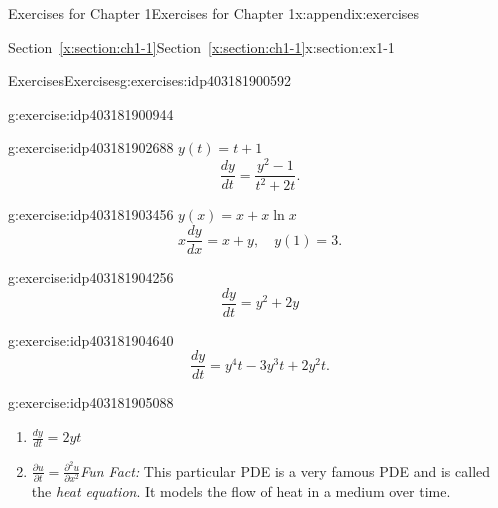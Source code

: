 \documentclass[oneside,10pt,]{book}
\newcommand{\xreffont}{\relax}
\numberwithin{equation}{section}
\numberwithin{equation}{section}
\begin{document}
\begin{appendixptx}{Exercises for Chapter 1}{}{Exercises for Chapter 1}{}{}{x:appendix:exercises}
%
%
\typeout{************************************************}
\typeout{Section B.1 Section~{\xreffont\ref*{x:section:ch1-1}}}
\typeout{************************************************}
%
\begin{sectionptx}{Section~{\xreffont\ref*{x:section:ch1-1}}}{}{Section~{\xreffont\ref*{x:section:ch1-1}}}{}{}{x:section:ex1-1}
%
%
\typeout{************************************************}
\typeout{************************************************}
%
\begin{exercises-subsection-numberless}{Exercises}{}{Exercises}{}{}{g:exercises:idp403181900592}
\begin{divisionexercise}{1}{}{}{g:exercise:idp403181900944}%
\end{divisionexercise}%
\begin{divisionexercise}{2}{}{}{g:exercise:idp403181902688}%
\(y(t)=t+1\)%
\begin{equation*}
\frac{dy}{dt}=\frac{y^{2}-1}{t^{2}+2t}.
\end{equation*}
\end{divisionexercise}%
\begin{divisionexercise}{3}{}{}{g:exercise:idp403181903456}%
\(y(x)=x+x\ln x\)%
\begin{equation*}
x\frac{dy}{dx}=x+y,\,\,\,\,\,\,y(1)=3.
\end{equation*}
\end{divisionexercise}%
\begin{divisionexercise}{4}{}{}{g:exercise:idp403181904256}%
%
\begin{equation*}
\frac{dy}{dt}=y^{2}+2y
\end{equation*}
\end{divisionexercise}%
\begin{divisionexercise}{5}{}{}{g:exercise:idp403181904640}%
%
\begin{equation*}
\frac{dy}{dt}=y^{4}t-3y^{3}t+2y^{2}t.
\end{equation*}
\end{divisionexercise}%
\begin{divisionexercise}{6}{}{}{g:exercise:idp403181905088}%
%
\begin{enumerate}[label=(\alph*)]
\item{}\(\displaystyle \frac{dy}{dt}=2yt\)%
\item{}\(\frac{\partial u}{\partial t}=\frac{\partial^{2}u}{\partial x^{2}}\)\emph{Fun Fact:} This particular PDE is a very famous PDE and is called the \emph{heat equation}. It models the flow of heat in a medium over time.%

\end{enumerate}
\end{divisionexercise}
\end{exercises-subsection-numberless}
\end{sectionptx}
\end{appendixptx}
\end{document}
